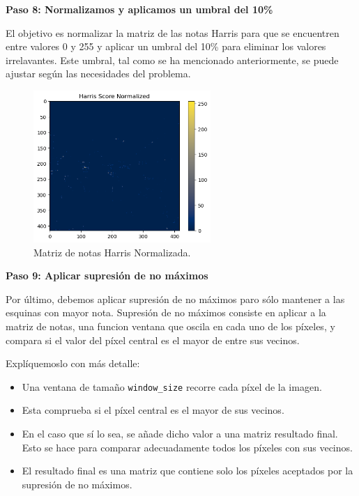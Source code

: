 \documentclass[a4paper]{article}
\begin{document}
\par\vspace{0.5cm}
\textbf{Paso 8: Normalizamos y aplicamos un umbral del 10\%}
\par\vspace{0.5cm}

El objetivo es normalizar la matriz de las notas Harris para que se encuentren
entre valores 0 y 255 y aplicar un umbral del 10\% para eliminar los valores irrelavantes. Este umbral, 
tal como se ha mencionado anteriormente, se puede ajustar según las necesidades del problema.

\begin{figure}[H]
    \centering
    \includegraphics[width=0.6\textwidth]{images/harris_paso_7.png}
    \caption{Matriz de notas Harris Normalizada.}
\end{figure}

\par\vspace{0.5cm}
\textbf{Paso 9: Aplicar supresión de no máximos}
\par\vspace{0.5cm}

Por último, debemos aplicar supresión de no máximos paro sólo mantener a las esquinas con mayor nota.
Supresión de no máximos consiste en aplicar a la matriz de notas, una funcion ventana que oscila en cada uno de los píxeles, y compara si el valor del píxel central es el mayor de entre sus vecinos.

Explíquemoslo con más detalle:

\begin{itemize}
    \item Una ventana de tamaño \texttt{window\_size} recorre cada píxel de la imagen.
    \item Esta comprueba si el píxel central es el mayor de sus vecinos.
    \item En el caso que sí lo sea, se añade dicho valor a una matriz resultado final. Esto se hace para comparar adecuadamente todos los píxeles con sus vecinos.
    \item El resultado final es una matriz que contiene solo los píxeles aceptados por la supresión de no máximos.
\end{itemize}
\end{document}
